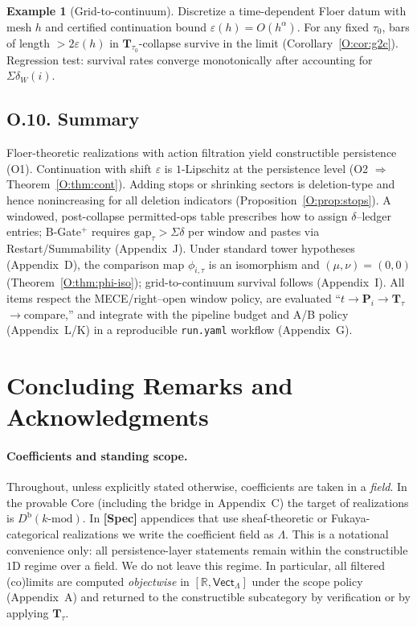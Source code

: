 \documentclass[11pt]{article}
\numberwithin{equation}{section}
\theoremstyle{plain}
\theoremstyle{definition}
\theoremstyle{remark}
\DeclareRobustCommand{\hyp}{\nobreakdash-}
\theoremstyle{plain}
\theoremstyle{definition}
\numberwithin{equation}{section}
\theoremstyle{definition}
\newtheorem{example}[theorem]{Example}
\numberwithin{equation}{section}
\theoremstyle{plain}
\theoremstyle{definition}
\theoremstyle{remark}
\begin{document}
\begin{example}[Grid-to-continuum]
Discretize a time-dependent Floer datum with mesh \(h\) and certified continuation bound \(\varepsilon(h)=O(h^\alpha)\). For any fixed \(\tau_0\), bars of length \(>2\varepsilon(h)\) in \(\mathbf{T}_{\tau_0}\)-collapse survive in the limit (Corollary~\ref{O:cor:g2c}). Regression test: survival rates converge monotonically after accounting for \(\Sigma\delta_W(i)\).
\end{example}

\subsection*{O.10. Summary}
Floer-theoretic realizations with action filtration yield constructible persistence (O1).
Continuation with shift \(\varepsilon\) is \(1\)\hyp Lipschitz at the persistence level (O2 \(\Rightarrow\) Theorem~\ref{O:thm:cont}).
Adding stops or shrinking sectors is deletion-type and hence nonincreasing for all deletion indicators (Proposition~\ref{O:prop:stops}).
A windowed, post-collapse permitted-ops table prescribes how to assign \(\delta\)–ledger entries; B-Gate\(^{+}\) requires \(\mathrm{gap}_\tau>\Sigma\delta\) per window and pastes via Restart/Summability (Appendix~J).
Under standard tower hypotheses (Appendix~D), the comparison map \(\phi_{i,\tau}\) is an isomorphism and \((\mu,\nu)=(0,0)\) (Theorem~\ref{O:thm:phi-iso}); grid-to-continuum survival follows (Appendix~I).
All items respect the MECE/right–open window policy, are evaluated “\(t\)\(\to\)\(\mathbf{P}_i\)\(\to\)\(\mathbf{T}_\tau\)\(\to\)compare,” and integrate with the pipeline budget and A/B policy (Appendix~L/K) in a reproducible \texttt{run.yaml} workflow (Appendix~G).



\section*{Concluding Remarks and Acknowledgments}

\paragraph{Coefficients and standing scope.}
Throughout, unless explicitly stated otherwise, coefficients are taken in a \emph{field}. In the provable Core (including the bridge in Appendix~C) the target of realizations is \(D^{\mathrm{b}}(k\text{-mod})\). In \textbf{[Spec]} appendices that use sheaf-theoretic or Fukaya-categorical realizations we write the coefficient field as \(\Lambda\). This is a notational convenience only: all persistence-layer statements remain within the constructible \(1\)D regime over a field. We do not leave this regime. In particular, all filtered (co)limits are computed \emph{objectwise} in \([\mathbb{R},\mathsf{Vect}_\Lambda]\) under the scope policy (Appendix~A) and returned to the constructible subcategory by verification or by applying \(\mathbf{T}_\tau\).
\end{document}
